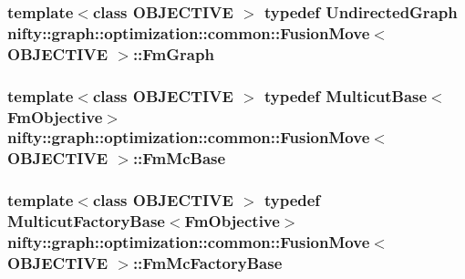 \subsubsection[{Fm\+Graph}]{\setlength{\rightskip}{0pt plus 5cm}template$<$class O\+B\+J\+E\+C\+T\+I\+V\+E $>$ typedef {\bf Undirected\+Graph} {\bf nifty\+::graph\+::optimization\+::common\+::\+Fusion\+Move}$<$ O\+B\+J\+E\+C\+T\+I\+V\+E $>$\+::{\bf Fm\+Graph}}\label{classnifty_1_1graph_1_1optimization_1_1common_1_1FusionMove_ab601d24bfed6306838a770dd33bc8d20}
\hypertarget{classnifty_1_1graph_1_1optimization_1_1common_1_1FusionMove_ad1c985b457ead4c14a19d262a54e3c7d}{}
\subsubsection[{Fm\+Mc\+Base}]{\setlength{\rightskip}{0pt plus 5cm}template$<$class O\+B\+J\+E\+C\+T\+I\+V\+E $>$ typedef Multicut\+Base$<${\bf Fm\+Objective}$>$ {\bf nifty\+::graph\+::optimization\+::common\+::\+Fusion\+Move}$<$ O\+B\+J\+E\+C\+T\+I\+V\+E $>$\+::{\bf Fm\+Mc\+Base}}\label{classnifty_1_1graph_1_1optimization_1_1common_1_1FusionMove_ad1c985b457ead4c14a19d262a54e3c7d}
\hypertarget{classnifty_1_1graph_1_1optimization_1_1common_1_1FusionMove_a6af63b2ed662deb28c716c462669cb37}{}
\subsubsection[{Fm\+Mc\+Factory\+Base}]{\setlength{\rightskip}{0pt plus 5cm}template$<$class O\+B\+J\+E\+C\+T\+I\+V\+E $>$ typedef Multicut\+Factory\+Base$<${\bf Fm\+Objective}$>$ {\bf nifty\+::graph\+::optimization\+::common\+::\+Fusion\+Move}$<$ O\+B\+J\+E\+C\+T\+I\+V\+E $>$\+::{\bf Fm\+Mc\+Factory\+Base}}\label{classnifty_1_1graph_1_1optimization_1_1common_1_1FusionMove_a6af63b2ed662deb28c716c462669cb37}
\hypertarget{classnifty_1_1graph_1_1optimization_1_1common_1_1FusionMove_a6a9b4fbe94395033bb21da945f181d71}{}
